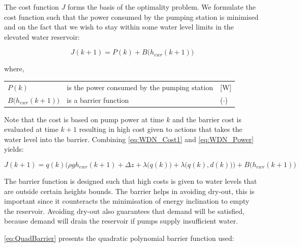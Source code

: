 The cost function $ J $ forms the basis of the optimality problem. We formulate the cost function such that the power consumed by the pumping station is minimised and on the fact that we wish to stay within some water level limits in the elevated water reservoir:

\begin{equation}\label{eq:WDN_Cost1}
	J(k+1) = P(k) + B\bigg(h_{ewr}(k+1)\bigg)  
\end{equation}  

where,
\begin{center}
	\begin{tabular}{l p{10cm} l}
		$ P(k) $ & is the power consumed by the pumping station & [\si{W}]\\
		$ B\bigg(h_{ewr}(k+1)\bigg) $ & is a barrier function & ($\cdot$)
	\end{tabular}
\end{center}

Note that the cost is based on pump power at time $ k $ and the barrier cost is evaluated at time $ k+1 $ resulting in high cost given to actions that takes the water level into the barrier. Combining \cref{eq:WDN_Cost1} and \cref{eq:WDN_Power} yields:

\begin{equation}\label{eq:CostFunctionFinal}
	J(k+1)= q(k)\bigg(\rho g h_{ewr}(k+1)+\Delta z+\lambda\bigg(q(k)\bigg)+\lambda \bigg(q(k),d(k) \bigg)\bigg) + B\bigg(h_{ewr}(k+1)\bigg) 
\end{equation}

The barrier function is  designed such that high costs is given to water levels that are outside certain heights bounds. The barrier helps in avoiding dry-out, this is important since it counteracts the minimisation of energy inclination to empty the reservoir. Avoiding dry-out also guarantees that demand will be satisfied, because demand will drain the reservoir if pumps supply insufficient water. 


\cref{eq:QuadBarrier} presents the quadratic polynomial barrier function used: 



